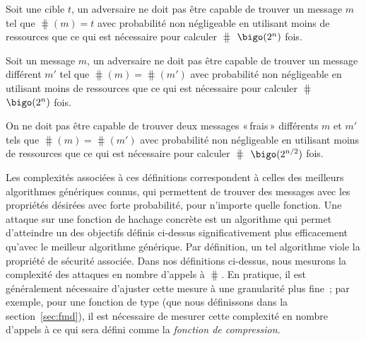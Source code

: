 \begin{fdefi}
Soit une cible $t$, un adversaire ne doit pas être capable de trouver un message
$m$ tel que $\hash(m) = t$ avec probabilité non négligeable en utilisant moins de ressources que ce qui est nécessaire pour calculer
$\hash$ $\bigo(2^n)$ fois.
\end{fdefi}
\begin{fdefi}
Soit un message $m$, un adversaire ne doit pas être capable de trouver un message différent $m'$ tel que
$\hash(m) = \hash(m')$  avec probabilité non négligeable en utilisant moins de ressources que
ce qui est nécessaire pour calculer $\hash$ $\bigo(2^n)$ fois.
\end{fdefi}
\begin{fdefi} On ne doit pas être capable de trouver deux messages «\,frais\,» différents $m$ et $m'$ tels que $\hash(m) =
\hash(m')$ avec probabilité non négligeable en utilisant moins de ressources que ce qui est nécessaire pour calculer  $\hash$ $\bigo(2^{n/2})$ fois.
\end{fdefi}

Les complexités associées à ces définitions correspondent à celles des meilleurs algorithmes génériques connus, qui permettent de trouver
des messages avec les propriétés désirées avec forte probabilité, pour n'importe quelle fonction.
Une attaque sur une fonction de hachage concrète est un algorithme qui permet d'atteindre un des objectifs définis ci-dessus significativement
plus efficacement qu'avec le meilleur algorithme générique. Par définition, un tel algorithme viole la propriété de sécurité associée.
Dans nos définitions ci-dessus, nous mesurons la complexité des attaques en nombre d'appels à $\hash$. En pratique, il est généralement
nécessaire d'ajuster cette mesure à une granularité plus fine~; par exemple, pour une fonction de type \merkdam (que nous définissons
dans la section~\ref{sec:fmd}), il est nécessaire de mesurer cette complexité en nombre d'appels à ce qui sera défini comme
la \emph{fonction de compression}.


